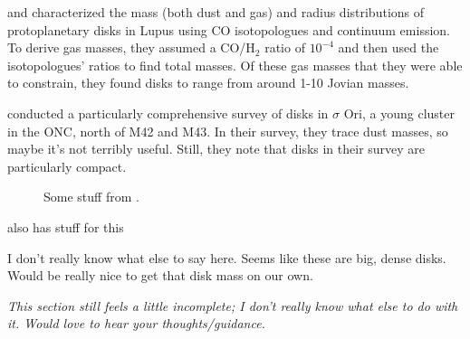 \citet{Ansdell2016} and \citet{Ansdell2018} characterized the mass (both dust and gas) and radius distributions of protoplanetary disks in Lupus using CO isotopologues and continuum emission. To derive gas masses, they assumed a CO/H$_2$ ratio of $10^{-4}$ and then used the isotopologues' ratios to find total masses. Of these gas masses that they were able to constrain, they found disks to range from around 1-10 Jovian masses.


\citet{Eisner2018} conducted a particularly comprehensive survey of disks in $\sigma$ Ori, a young cluster in the ONC, north of M42 and M43. In their survey, they trace dust masses, so maybe it's not terribly useful. Still, they note that disks in their survey are particularly compact.

\begin{figure}[ht]
  \centering
    \hspace*{\fill}%
    \hspace*{\fill}%
    \caption{Some stuff from \citet{Eisner2018}.}
    \label{fig:bf_disk_strs}
\end{figure}

\citet{Cieza2019} also has stuff for this

I don't really know what else to say here. Seems like these are big, dense disks. Would be really nice to get that disk mass on our own.







\textit{This section still feels a little incomplete; I don't really know what else to do with it. Would love to hear your thoughts/guidance.}






